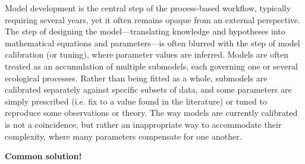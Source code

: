 \documentclass[11pt]{article}
\begin{document}
\begin{tcolorbox}
{\begin{multicols}{2}
\noindent %
Model development is the central step of the process-based workflow, typically requiring several years, yet it often remains opaque from an external perspective. The step of designing the model---translating knowledge and hypotheses into mathematical equations and parameters---is often blurred with the step of model calibration (or tuning), where parameter values are inferred. Models are often treated as an accumulation of multiple submodels, each governing one or several ecological processes. Rather than being fitted as a whole, submodels are calibrated separately against specific subsets of data, and some parameters are simply prescribed (i.e. fix to a value found in the literature) or tuned to reproduce some observations or theory. The way models are currently calibrated is not a coincidence,
but rather an inappropriate way to accommodate their complexity, where many parameters compensate for one another.

\vfill

\end{multicols}}

\centerline{\bf Common solution!}
\vspace{0.2cm}
\noindent{}

\end{tcolorbox}
\end{document}
